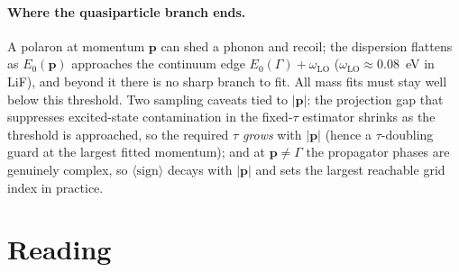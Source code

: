 \documentclass[11pt]{article}
\newcommand{\pv}{\mathbf{p}}
\begin{document}
\paragraph{Where the quasiparticle branch ends.} A polaron at momentum $\pv$ can shed a
phonon and recoil; the dispersion flattens as $E_{0}(\pv)$ approaches the continuum edge
$E_{0}(\Gamma)+\omega_{\mathrm{LO}}$ ($\omega_{\mathrm{LO}}\approx0.08$~eV in LiF), and
beyond it there is no sharp branch to fit. All mass fits must stay well below this
threshold. Two sampling caveats tied to $|\pv|$: the projection gap that suppresses
excited-state contamination in the fixed-$\tau$ estimator shrinks as the threshold is
approached, so the required $\tau$ \emph{grows} with $|\pv|$ (hence a $\tau$-doubling
guard at the largest fitted momentum); and at $\pv\neq\Gamma$ the propagator phases are
genuinely complex, so $\langle\mathrm{sign}\rangle$ decays with $|\pv|$ and sets the
largest reachable grid index in practice.

\section{Reading}
\label{sec:reading}
\end{document}
